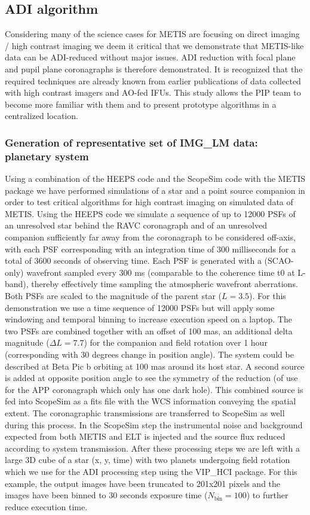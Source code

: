 \subsection{ADI algorithm}\label{ssec:criticaladialgorithm}
Considering many of the science cases for METIS are focusing on direct imaging / high contrast imaging we deem it critical that we demonstrate that METIS-like data can be ADI-reduced without major issues.
ADI reduction with focal plane and pupil plane coronagraphs is therefore demonstrated. %
It is recognized that the required techniques are already known from earlier publications of data collected with high contrast imagers and AO-fed IFUs.
This study allows the PIP team to become more familiar with them and to present prototype algorithms in a centralized location.

\subsubsection{Generation of representative set of IMG\_LM data: planetary system}
Using a combination of the HEEPS code and the ScopeSim code with the METIS package we have performed simulations of a star and a point source companion in order to test critical algorithms for high contrast imaging on simulated data of METIS.
Using the HEEPS code we simulate a sequence of up to 12000 PSFs of an unresolved star behind the RAVC coronagraph and of an unresolved companion sufficiently far away from the coronagraph to be considered off-axis, with each PSF corresponding with an integration time of 300 milliseconds for a total of 3600 seconds of observing time. Each PSF is generated with a (SCAO-only) wavefront sampled every 300 ms (comparable to the coherence time t0 at L-band), thereby effectively time sampling the atmospheric wavefront aberrations. Both PSFs are scaled to the magnitude of the parent star ($L=3.5$). For this demonstration we use a time sequence of 12000 PSFs but will apply some windowing and temporal binning to increase execution speed on a laptop. 
The two PSFs are combined together with an offset of 100 mas, an additional delta magnitude ($\Delta L=7.7$) for the companion and field rotation over 1 hour (corresponding with 30 degrees change in position angle). The system could be described at Beta Pic b orbiting at 100 mas around its host star. A second source is added at opposite position angle to see the symmetry of the reduction (of use for the APP coronagraph which only has one dark hole). This combined source is fed into ScopeSim as a fits file with the WCS information conveying the spatial extent. The coronagraphic transmissions are transferred to ScopeSim as well during this process.
In the ScopeSim step the instrumental noise and background expected from both METIS and ELT is injected and the source flux reduced according to system transmission. 
After these processing steps we are left with a large 3D cube of a star (x, y, time) with two planets undergoing field rotation which we use for the ADI processing step using the VIP\_HCI package. For this example, the output images have been truncated to 201x201 pixels and the images have been binned to 30 seconds exposure time ($N_\mathrm{bin}=100$) to further reduce execution time.
